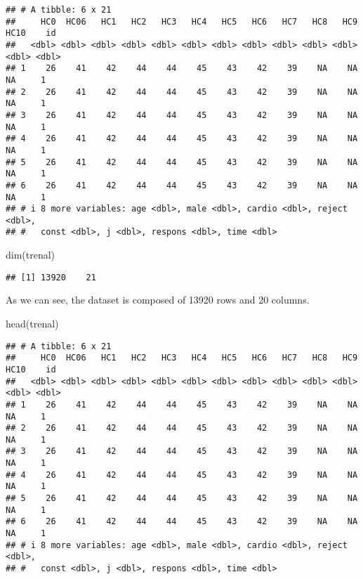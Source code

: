 \documentclass[
]{article}
\newenvironment{Shaded}{\begin{snugshade}}{\end{snugshade}}
\newcommand{\FunctionTok}[1]{\textcolor[rgb]{0.00,0.00,0.00}{#1}}
\newcommand{\NormalTok}[1]{#1}
\begin{document}
\begin{verbatim}
## # A tibble: 6 x 21
##     HC0  HC06   HC1   HC2   HC3   HC4   HC5   HC6   HC7   HC8   HC9  HC10    id
##   <dbl> <dbl> <dbl> <dbl> <dbl> <dbl> <dbl> <dbl> <dbl> <dbl> <dbl> <dbl> <dbl>
## 1    26    41    42    44    44    45    43    42    39    NA    NA    NA     1
## 2    26    41    42    44    44    45    43    42    39    NA    NA    NA     1
## 3    26    41    42    44    44    45    43    42    39    NA    NA    NA     1
## 4    26    41    42    44    44    45    43    42    39    NA    NA    NA     1
## 5    26    41    42    44    44    45    43    42    39    NA    NA    NA     1
## 6    26    41    42    44    44    45    43    42    39    NA    NA    NA     1
## # i 8 more variables: age <dbl>, male <dbl>, cardio <dbl>, reject <dbl>,
## #   const <dbl>, j <dbl>, respons <dbl>, time <dbl>
\end{verbatim}

\begin{Shaded}
\begin{Highlighting}[]
\FunctionTok{dim}\NormalTok{(trenal)}
\end{Highlighting}
\end{Shaded}

\begin{verbatim}
## [1] 13920    21
\end{verbatim}

As we can see, the dataset is composed of 13920 rows and 20 columns.

\begin{Shaded}
\begin{Highlighting}[]
\FunctionTok{head}\NormalTok{(trenal)}
\end{Highlighting}
\end{Shaded}

\begin{verbatim}
## # A tibble: 6 x 21
##     HC0  HC06   HC1   HC2   HC3   HC4   HC5   HC6   HC7   HC8   HC9  HC10    id
##   <dbl> <dbl> <dbl> <dbl> <dbl> <dbl> <dbl> <dbl> <dbl> <dbl> <dbl> <dbl> <dbl>
## 1    26    41    42    44    44    45    43    42    39    NA    NA    NA     1
## 2    26    41    42    44    44    45    43    42    39    NA    NA    NA     1
## 3    26    41    42    44    44    45    43    42    39    NA    NA    NA     1
## 4    26    41    42    44    44    45    43    42    39    NA    NA    NA     1
## 5    26    41    42    44    44    45    43    42    39    NA    NA    NA     1
## 6    26    41    42    44    44    45    43    42    39    NA    NA    NA     1
## # i 8 more variables: age <dbl>, male <dbl>, cardio <dbl>, reject <dbl>,
## #   const <dbl>, j <dbl>, respons <dbl>, time <dbl>
\end{verbatim}
\end{document}
